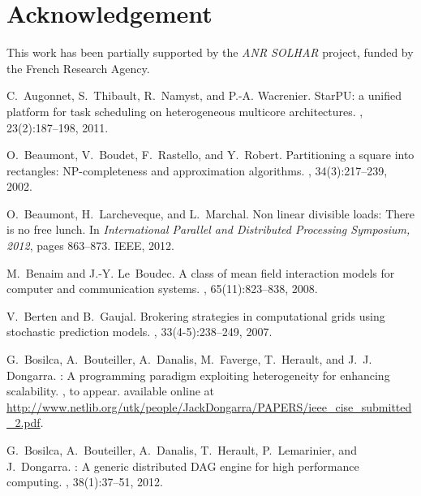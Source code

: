 \documentclass[a4paper,10pt]{article}
\begin{document}
 


\section{Acknowledgement}

This work has been partially supported by the {\em ANR SOLHAR}
project, funded by the French Research Agency.

\begin{thebibliography}{10}

C.~Augonnet, S.~Thibault, R.~Namyst, and P.-A. Wacrenier.
\newblock StarPU: a unified platform for task scheduling on heterogeneous
  multicore architectures.
,
  23(2):187--198, 2011.

O.~Beaumont, V.~Boudet, F.~Rastello, and Y.~Robert.
\newblock Partitioning a square into rectangles: NP-completeness and
  approximation algorithms.
, 34(3):217--239, 2002.

O.~Beaumont, H.~Larcheveque, and L.~Marchal.
\newblock Non linear divisible loads: There is no free lunch.
\newblock In {\em International Parallel and Distributed Processing Symposium,
  2012}, pages 863--873. IEEE, 2012.

M.~Benaim and J.-Y. Le~Boudec.
\newblock A class of mean field interaction models for computer and
  communication systems.
, 65(11):823--838, 2008.

V.~Berten and B.~Gaujal.
\newblock Brokering strategies in computational grids using stochastic
  prediction models.
, 33(4-5):238--249, 2007.

G.~Bosilca, A.~Bouteiller, A.~Danalis, M.~Faverge, T.~Herault, and J.~J.
  Dongarra.
: A programming paradigm exploiting heterogeneity for
  enhancing scalability.
, to appear.
\newblock available online at
  \url{http://www.netlib.org/utk/people/JackDongarra/PAPERS/ieee_cise_submitted_2.pdf}.


G.~Bosilca, A.~Bouteiller, A.~Danalis, T.~Herault, P.~Lemarinier, and
  J.~Dongarra.
: A generic distributed DAG engine for high performance
  computing.
, 38(1):37--51, 2012.




\end{thebibliography}
\end{document}
